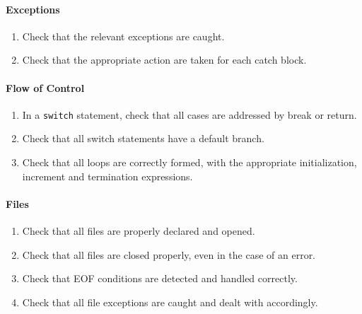 \paragraph*{Exceptions}\begin{enumerate}[resume]
\item Check that the relevant exceptions are caught.
\item Check that the appropriate action are taken for each catch block.
\end{enumerate}

\paragraph*{Flow of Control}\begin{enumerate}[resume]
\item In a \texttt{switch} statement, check that all cases are addressed by break or return.
\item Check that all switch statements have a default branch.
\item Check that all loops are correctly formed, with the appropriate initialization, increment and termination expressions.
\end{enumerate}

\paragraph*{Files}\begin{enumerate}[resume]
\item Check that all files are properly declared and opened.
\item Check that all files are closed properly, even in the case of an error.
\item Check that EOF conditions are detected and handled correctly.
\item Check that all file exceptions are caught and dealt with accordingly.
\end{enumerate}


